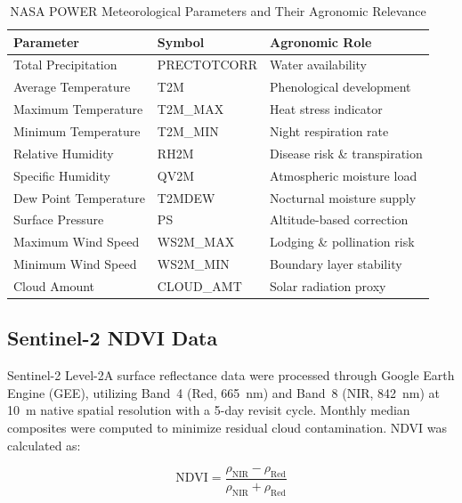 \documentclass[conference]{IEEEtran}
\begin{document}
\begin{table}[htbp]
\caption{NASA POWER Meteorological Parameters and Their Agronomic Relevance}
\label{tab:features}
\centering
\renewcommand{\arraystretch}{1.15}
\begin{tabular}{@{}lll@{}}
\toprule
\textbf{Parameter} & \textbf{Symbol} & \textbf{Agronomic Role} \\
\midrule
Total Precipitation    & PRECTOTCORR & Water availability         \\
Average Temperature    & T2M         & Phenological development   \\
Maximum Temperature    & T2M\_MAX    & Heat stress indicator      \\
Minimum Temperature    & T2M\_MIN    & Night respiration rate     \\
Relative Humidity      & RH2M        & Disease risk \& transpiration \\
Specific Humidity      & QV2M        & Atmospheric moisture load  \\
Dew Point Temperature  & T2MDEW      & Nocturnal moisture supply  \\
Surface Pressure       & PS          & Altitude-based correction  \\
Maximum Wind Speed     & WS2M\_MAX   & Lodging \& pollination risk \\
Minimum Wind Speed     & WS2M\_MIN   & Boundary layer stability   \\
Cloud Amount           & CLOUD\_AMT  & Solar radiation proxy      \\
\bottomrule
\end{tabular}
\end{table}

\subsection{Sentinel-2 NDVI Data}

Sentinel-2 Level-2A surface reflectance data were processed through Google
Earth Engine (GEE), utilizing Band~4 (Red, \SI{665}{\nano\metre}) and
Band~8 (NIR, \SI{842}{\nano\metre}) at \SI{10}{\metre} native spatial
resolution with a 5-day revisit cycle. Monthly median composites were computed
to minimize residual cloud contamination. NDVI was calculated as:

\begin{equation}
\text{NDVI} = \frac{\rho_\text{NIR} - \rho_\text{Red}}{\rho_\text{NIR} + \rho_\text{Red}}
\label{eq:ndvi}
\end{equation}
\end{document}
